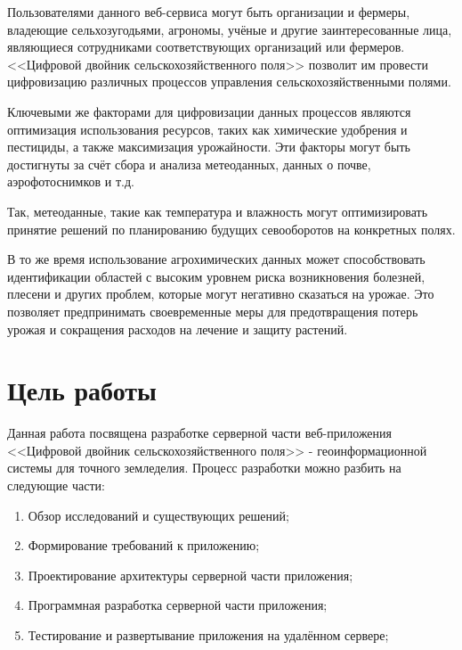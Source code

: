     Пользователями данного веб-сервиса могут быть организации и фермеры, владеющие сельхозугодьями, агрономы, учёные и другие заинтересованные лица, являющиеся сотрудниками соответствующих организаций или фермеров. <<Цифровой двойник сельскохозяйственного поля>> позволит им провести цифровизацию различных процессов управления сельскохозяйственными полями. 
    
    Ключевыми же факторами для цифровизации данных процессов являются оптимизация использования ресурсов, таких как химические удобрения и пестициды, а также максимизация урожайности. Эти факторы могут быть достигнуты за счёт сбора и анализа метеоданных, данных о почве, аэрофотоснимков и т.д. 
    
    Так, метеоданные, такие как температура и влажность могут оптимизировать принятие решений по планированию будущих севооборотов на конкретных полях.
    
    В то же время использование агрохимических данных может способствовать идентификации областей с высоким уровнем риска возникновения болезней, плесени и других проблем, которые могут негативно сказаться на урожае. Это позволяет предпринимать своевременные меры для предотвращения потерь урожая и сокращения расходов на лечение и защиту растений.

    
    
    \section{Цель работы} \label{target}
    
    Данная работа посвящена разработке серверной части веб-приложения <<Цифровой двойник сельскохозяйственного поля>> - геоинформационной системы для точного земледелия. Процесс разработки можно разбить на следующие части:

    \begin{enumerate}
            \item Обзор исследований и существующих решений;
            \item Формирование требований к приложению;
            \item Проектирование архитектуры серверной части приложения;
            \item Программная разработка серверной части приложения;
            \item Тестирование и развертывание приложения на удалённом сервере;

    \end{enumerate}


